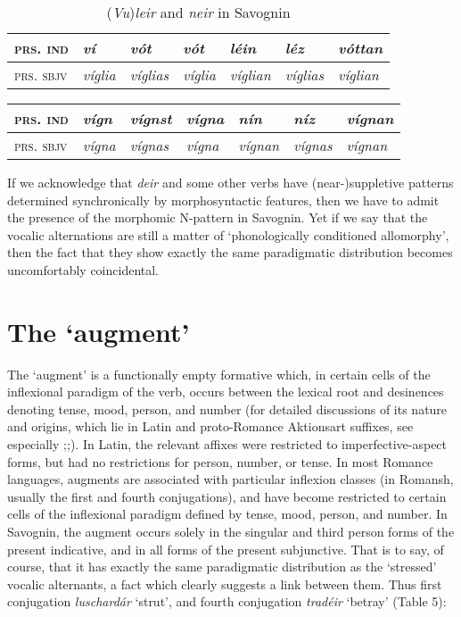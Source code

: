 \documentclass[output=paper,
modfonts
]{LSP/langsci}
\begin{document}

\begin{longtable}[]{@{}lllllll@{}}
\caption{(\emph{Vu})\emph{leir} and \emph{neir} in Savognin}\\
\lsptoprule
\textsc{prs. ind} & \emph{ví} & \emph{vót} & \emph{vót} & \emph{léin} &
\emph{léz} & \emph{vóttan}\tabularnewline
\midrule
\endhead
\textsc{prs. sbjv} & \emph{víglia} & \emph{víglias} & \emph{víglia} &
\emph{víglian} & \emph{víglias} & \emph{víglian}\tabularnewline
\bottomrule
\end{longtable}\addtocounter{table}{-1}

\begin{longtable}[]{@{}lllllll@{}}
\lsptoprule
\textsc{prs. ind} & \emph{vígn} & \emph{vígnst} & \emph{vígna} &
\emph{nín} & \emph{níz} & \emph{vígnan}\tabularnewline
\midrule
\endhead
\textsc{prs. sbjv} & \emph{vígna} & \emph{vígnas} & \emph{vígna} &
\emph{vígnan} & \emph{vígnas} & \emph{vígnan}\tabularnewline
\bottomrule
\end{longtable}

If we acknowledge that \emph{deir} and some other verbs have
(near-)suppletive patterns determined synchronically by morphosyntactic
features, then we have to admit the presence of the morphomic N-pattern
in Savognin. Yet if we say that the vocalic alternations are still a
matter of `phonologically conditioned allomorphy', then the fact that
they show exactly the same paradigmatic distribution becomes
uncomfortably coincidental.

\section{The `augment'}\label{the-augment}

The `augment' is a functionally empty formative which, in certain cells
of the inflexional paradigm of the verb, occurs between the lexical root
and desinences denoting tense, mood, person, and number (for detailed
discussions of its nature and origins, which lie in Latin and
proto-Romance Aktionsart suffixes, see especially \citealt{maiden2003};\citeyear[249--53]{maiden2011c};\citeyear[715f.]{maiden2016}). In Latin, the relevant affixes were
restricted to imperfective-aspect forms, but had no restrictions for
person, number, or tense. In most Romance languages, augments are
associated with particular inflexion classes (in Romansh, usually the
first and fourth conjugations), and have become restricted to certain
cells of the inflexional paradigm defined by tense, mood, person, and
number. In Savognin, the augment occurs solely in the singular and third
person forms of the present indicative, and in all forms of the present
subjunctive. That is to say, of course, that it has exactly the same
paradigmatic distribution as the `stressed' vocalic alternants, a fact
which clearly suggests a link between them. Thus first conjugation
\emph{luschardár} `strut', and fourth conjugation \emph{tradéir}
`betray' (Table 5):
\end{document}
